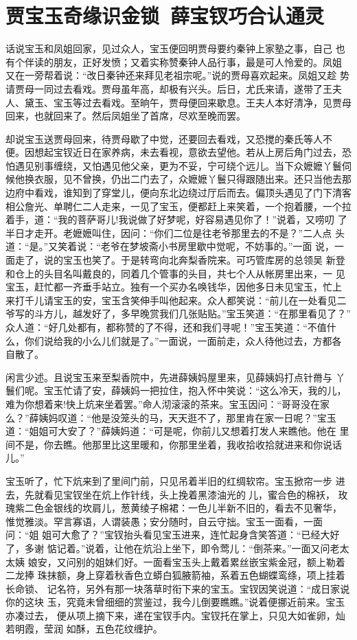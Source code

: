 \chapter{贾宝玉奇缘识金锁~薛宝钗巧合认通灵}

话说宝玉和凤姐回家，见过众人，宝玉便回明贾母要约秦钟上家塾之事，自己
也有个伴读的朋友，正好发愤；又着实称赞秦钟人品行事，最是可人怜爱的。凤姐
又在一旁帮着说：“改日秦钟还来拜见老祖宗呢。”说的贾母喜欢起来。凤姐又趁
势请贾母一同过去看戏。贾母虽年高，却极有兴头。后日，尤氏来请，遂带了王夫
人、黛玉、宝玉等过去看戏。至晌午，贾母便回来歇息。王夫人本好清净，见贾母
回来，也就回来了。然后凤姐坐了首席，尽欢至晚而罢。

却说宝玉送贾母回来，待贾母歇了中觉，还要回去看戏，又恐搅的秦氏等人不
便。因想起宝钗近日在家养病，未去看视，意欲去望他。若从上房后角门过去，恐
怕遇见别事缠绕，又怕遇见他父亲，更为不妥，宁可绕个远儿。当下众嬷嬷丫鬟伺
候他换衣服，见不曾换，仍出二门去了，众嬷嬷丫鬟只得跟随出来。还只当他去那
边府中看戏，谁知到了穿堂儿，便向东北边绕过厅后而去。偏顶头遇见了门下清客
相公詹光、单聘仁二人走来，一见了宝玉，便都赶上来笑着，一个抱着腰，一个拉
着手，道：“我的菩萨哥儿!我说做了好梦呢，好容易遇见你了！”说着，又唠叨
了半日才走开。老嬷嬷叫住，因问：“你们二位是往老爷那里去的不是？”二人点
头道：“是。”又笑着说：“老爷在梦坡斋小书房里歇中觉呢，不妨事的。”一面
说，一面走了，说的宝玉也笑了。于是转弯向北奔梨香院来。可巧管库房的总领吴
新登和仓上的头目名叫戴良的，同着几个管事的头目，共七个人从帐房里出来，一
见宝玉，赶忙都一齐垂手站立。独有一个买办名唤钱华，因他多日未见宝玉，忙上
来打千儿请宝玉的安，宝玉含笑伸手叫他起来。众人都笑说：“前儿在一处看见二
爷写的斗方儿，越发好了，多早晚赏我们几张贴贴。”宝玉笑道：“在那里看见了？”
众人道：“好几处都有，都称赞的了不得，还和我们寻呢！”宝玉笑道：“不值什
么，你们说给我的小么儿们就是了。”一面说，一面前走，众人待他过去，方都各
自散了。

闲言少述。且说宝玉来至梨香院中，先进薛姨妈屋里来，见薛姨妈打点针黹与
丫鬟们呢。宝玉忙请了安，薛姨妈一把拉住，抱入怀中笑说：“这么冷天，我的儿，
难为你想着来!快上炕来坐着罢。”命人沏滚滚的茶来。宝玉因问：“哥哥没在家
么？”薛姨妈叹道：“他是没笼头的马，天天逛不了，那里肯在家一日呢？”宝玉
道：“姐姐可大安了？”薛姨妈道：“可是呢，你前儿又想着打发人来瞧他。他在
里间不是，你去瞧。他那里比这里暖和，你那里坐着，我收拾收拾就进来和你说话
儿。”

宝玉听了，忙下炕来到了里间门前，只见吊着半旧的红绸软帘。宝玉掀帘一步
进去，先就看见宝钗坐在炕上作针线，头上挽着黑漆油光的儿，蜜合色的棉袄，
玫瑰紫二色金银线的坎肩儿，葱黄绫子棉裙：一色儿半新不旧的，看去不见奢华，
惟觉雅淡。罕言寡语，人谓装愚；安分随时，自云守拙。宝玉一面看，一面问：“姐
姐可大愈了？”宝钗抬头看见宝玉进来，连忙起身含笑答道：“已经大好了，多谢
惦记着。”说着，让他在炕沿上坐下，即令莺儿：“倒茶来。”一面又问老太太姨
娘安，又问别的姐妹们好。一面看宝玉头上戴着累丝嵌宝紫金冠，额上勒着二龙捧
珠抹额，身上穿着秋香色立蟒白狐腋箭袖，系着五色蝴蝶鸾绦，项上挂着长命锁、
记名符，另外有那一块落草时衔下来的宝玉。宝钗因笑说道：“成日家说你的这块
玉，究竟未曾细细的赏鉴过，我今儿倒要瞧瞧。”说着便挪近前来。宝玉亦凑过去，
便从项上摘下来，递在宝钗手内。宝钗托在掌上，只见大如雀卵，灿若明霞，莹润
如酥，五色花纹缠护。

